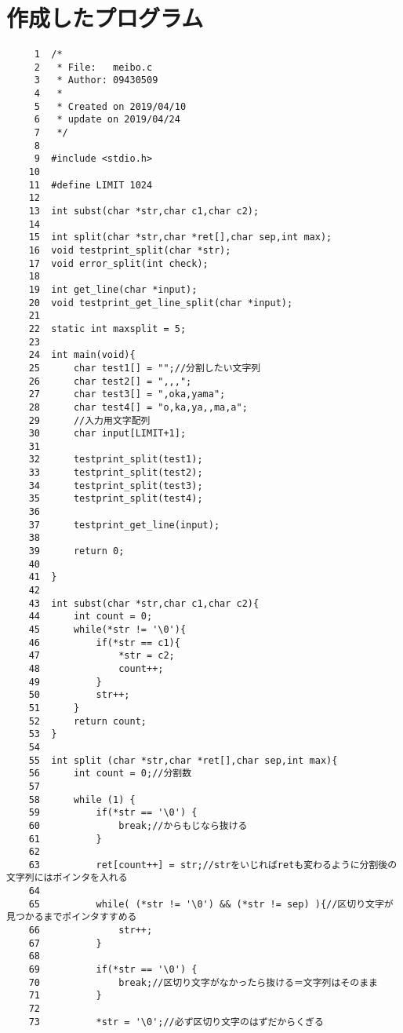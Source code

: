\documentclass[a4j,11pt]{jarticle}
\begin{document}
\section{作成したプログラム} \label{sec:sourcecode}
{\fontsize{10pt}{11pt} \selectfont
\begin{verbatim}
     1	/* 
     2	 * File:   meibo.c
     3	 * Author: 09430509
     4	 *
     5	 * Created on 2019/04/10
     6	 * update on 2019/04/24
     7	 */
     8	
     9	#include <stdio.h>
    10	
    11	#define LIMIT 1024
    12	
    13	int subst(char *str,char c1,char c2);
    14	
    15	int split(char *str,char *ret[],char sep,int max);
    16	void testprint_split(char *str);
    17	void error_split(int check);
    18	
    19	int get_line(char *input);
    20	void testprint_get_line_split(char *input);
    21	
    22	static int maxsplit = 5;
    23	
    24	int main(void){
    25	    char test1[] = "";//分割したい文字列
    26	    char test2[] = ",,,";
    27	    char test3[] = ",oka,yama";
    28	    char test4[] = "o,ka,ya,,ma,a";
    29	    //入力用文字配列
    30	    char input[LIMIT+1];
    31	    
    32	    testprint_split(test1);
    33	    testprint_split(test2);
    34	    testprint_split(test3);
    35	    testprint_split(test4);
    36	
    37	    testprint_get_line(input);
    38	    
    39	    return 0;
    40	
    41	}
    42	
    43	int subst(char *str,char c1,char c2){
    44	    int count = 0;
    45	    while(*str != '\0'){
    46	        if(*str == c1){
    47	            *str = c2;
    48	            count++;
    49	        }
    50	        str++;
    51	    }
    52	    return count;
    53	}
    54	
    55	int split (char *str,char *ret[],char sep,int max){
    56	    int count = 0;//分割数
    57	
    58	    while (1) {
    59	        if(*str == '\0') {
    60	            break;//からもじなら抜ける
    61	        }
    62	       
    63	        ret[count++] = str;//strをいじればretも変わるように分割後の文字列にはポインタを入れる
    64	
    65	        while( (*str != '\0') && (*str != sep) ){//区切り文字が見つかるまでポインタすすめる 
    66	            str++;
    67	        }
    68	        
    69	        if(*str == '\0') {
    70	            break;//区切り文字がなかったら抜ける＝文字列はそのまま
    71	        }                                                                                                   
    72	
    73	        *str = '\0';//必ず区切り文字のはずだからくぎる

\end{verbatim}}
\end{document}
